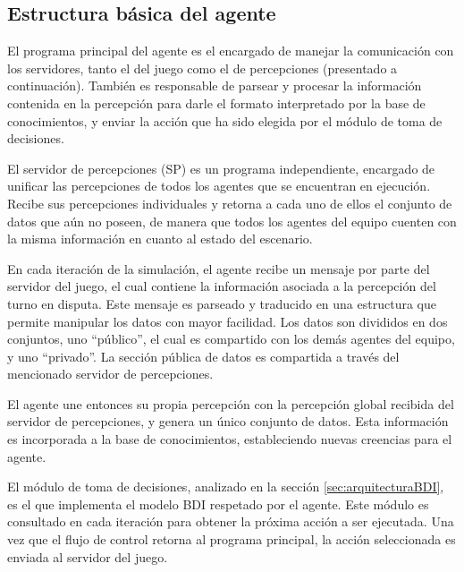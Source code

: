 \documentclass[oneside]{book}
\begin{document}
\subsection{Estructura básica del agente}


El programa principal del agente es el encargado de manejar la comunicación con los 
servidores, tanto el del juego como el de percepciones (presentado 
a continuación). También es responsable de parsear y procesar la información contenida 
en la percepción para darle el formato interpretado por la base de conocimientos, y 
enviar la acción que ha sido elegida por el módulo de toma de decisiones.


El servidor de percepciones (SP) es un programa independiente, encargado de unificar las 
percepciones de todos los agentes que se encuentran en ejecución. Recibe sus percepciones 
individuales y retorna a cada uno de ellos el conjunto de datos que aún no poseen, de 
manera que todos los agentes del equipo cuenten con la misma información en cuanto al estado 
del escenario.

En cada iteración de la simulación, el agente recibe un mensaje por parte del servidor 
del juego, el cual contiene la información asociada a la percepción del turno en disputa. 
Este mensaje es parseado y traducido en una estructura que permite manipular los datos 
con mayor facilidad. Los datos son divididos en dos conjuntos, uno ``público'', el cual 
es compartido con los demás agentes del equipo, y uno ``privado''. La sección pública de 
datos es compartida a través del mencionado servidor de percepciones.

El agente une entonces su propia percepción con la percepción global recibida del servidor 
de percepciones, y genera un único conjunto de datos. Esta información es incorporada a la 
base de conocimientos, estableciendo nuevas creencias para el agente.

El módulo de toma de decisiones, analizado en la sección \ref{sec:arquitecturaBDI}, es el 
que implementa el modelo BDI respetado por el agente. Este módulo es consultado en cada 
iteración para obtener la próxima acción a ser ejecutada. Una vez que el flujo de control 
retorna al programa principal, la acción seleccionada es enviada al servidor del juego.
\end{document}
